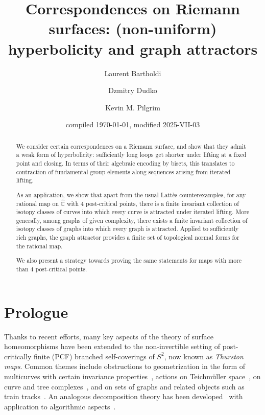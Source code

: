 \documentclass{amsart}
\newcommand\C{{\mathbb{C}}}
\newcommand\Pone{{\widehat\C}}
\theoremstyle{definition}
\theoremstyle{remark}
\begin{document}
\author{Laurent Bartholdi} 

\author{Dzmitry Dudko}

\author{Kevin M. Pilgrim}

\title[Correspondences on Riemann surfaces]{Correspondences on Riemann surfaces: (non-uniform) hyperbolicity and graph attractors}

\begin{abstract}
   We consider certain correspondences on a Riemann surface, and show that they admit a weak form of hyperbolicity: sufficiently long loops get shorter under lifting at a fixed point and closing.  In terms of their algebraic encoding by bisets, this translates to contraction of fundamental group elements along sequences arising from iterated lifting. 

   As an application, we show that apart from the usual Latt\`es counterexamples, for any rational map on $\Pone$ with $4$ post-critical points, there is a finite invariant collection of isotopy classes of curves into which every curve is attracted under iterated lifting.  More generally, among graphs of given complexity, there exists a finite invariant collection of isotopy classes of graphs into which every graph is attracted. Applied to sufficiently rich graphs, the graph attractor provides a finite set of topological normal forms for the rational map.

   We also present a strategy towards proving the same statements for maps with more than $4$ post-critical points.
 \end{abstract}



\date{compiled \today, modified 2025-VII-03}

\maketitle
\setcounter{tocdepth}{1}


\section*{Prologue}
Thanks to recent efforts, many key aspects of the theory of surface homeomorphisms have been extended to the non-invertible setting of post-critically finite (PCF) branched self-coverings of $S^2$, now known as \emph{Thurston maps}.  Common themes include obstructions to geometrization in the form of multicurves with certain invariance properties~\cite{MR1251582, farb:margalit:mcg, MR3071467}, actions on Teichmüller space~\cite{ Belk:2023aa, selinger:pullback}, on curve and tree complexes~\cite{MR4510015}, and on sets of graphs and related objects such as train tracks~\cite{zbMATH07239271, MR4068871}.  An analogous decomposition theory has been developed~\cite{MR2020454} with application to algorithmic aspects~\cite{MR3781419, MR3434502, MR3443373, MR4278340}.
\end{document}
